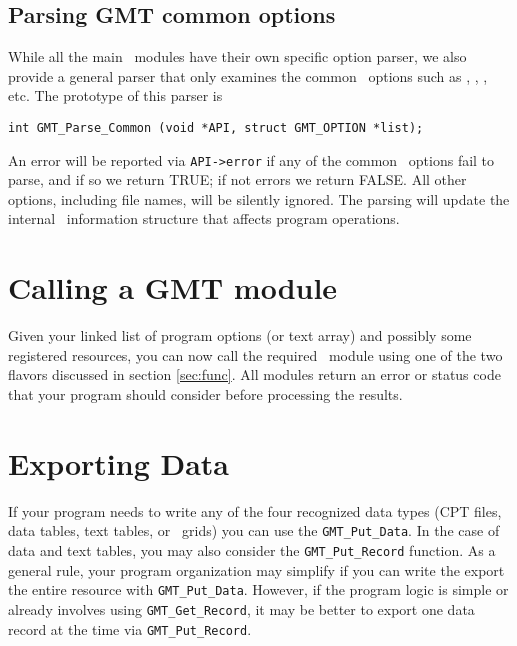\documentclass[11pt]{report}
\begin{document}
\subsection{Parsing GMT common options}

While all the main \GMT\ modules have their own specific option parser, we also provide a general
parser that only examines the common \GMT\ options such as , , , etc.  The prototype
of this parser is


\begin{verbatim}
int GMT_Parse_Common (void *API, struct GMT_OPTION *list);
\end{verbatim}

An error will be reported via \texttt{API->error} if any of the common \GMT\ options fail to parse,
and if so we return TRUE; if not errors we return FALSE.  All other options,
including file names, will be silently ignored.  The parsing will update the internal \GMT\
information structure that affects program operations.

\section{Calling a GMT module}

Given your linked list of program options (or text array) and possibly some registered resources, you
can now call the required \GMT\ module using one of the two flavors discussed in section {\ref{sec:func}}.
All modules return an error or status code that your program should consider before processing the results.

\section{Exporting Data}

If your program needs to write any of the four recognized data types (CPT files, data tables, text tables, or \GMT\ grids)
you can use the \texttt{GMT\_Put\_Data}. In the case of data and text tables, you may also consider the
\texttt{GMT\_Put\_Record} function.
As a general rule, your program organization may simplify if you can write the export the entire resource with
\texttt{GMT\_Put\_Data}.  However, if the program logic is simple or already involves using \texttt{GMT\_Get\_Record},
it may be better to export one data record at the time via \texttt{GMT\_Put\_Record}.
\end{document}
